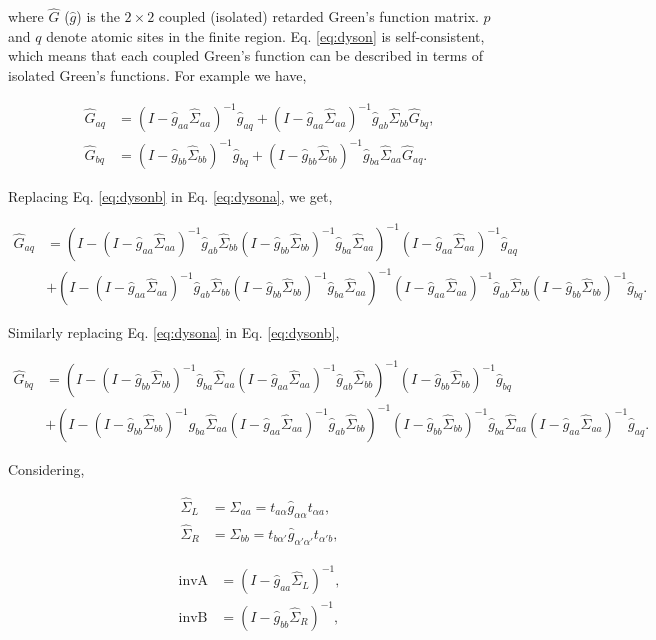 \documentclass[10pt,prb,showpacs,amssymb,floatfix]{revtex4-1}
\newcommand{\tx}{\text}
\newcommand{\nn}{\nonumber}
\newcommand{\alp}{\alpha}
\newcommand{\Sg}{\Sigma}
\newcommand{\h}{\hat}
\begin{document}
where $\h G$ ($\h g$) is the $2\times2$ coupled (isolated) retarded Green's function matrix. $p$ and $q$ denote  atomic sites in the finite region.  Eq. \eqref{eq:dyson} is self-consistent, which means that each coupled Green's function can be described in terms of isolated Green's functions. For example we have,

\begin{align}
\label{eq:dysona}
{\hat G}_{aq}&= (I-\h g_{aa}\h \Sg_{aa})^{-1}\h g_{aq} + (I-\h g_{aa}\h \Sg_{aa})^{-1}\h g_{ab}\h \Sg_{bb}\h G_{bq}, \\
{\hat G}_{bq}&= (I-\h g_{bb}\h \Sg_{bb})^{-1}\h g_{bq} + (I-\h g_{bb}\h \Sg_{bb})^{-1}\h g_{ba}\h \Sg_{aa}\h G_{aq}.
\label{eq:dysonb}
\end{align}

Replacing Eq. \eqref{eq:dysonb} in Eq. \eqref{eq:dysona}, we get,

 \begin{align}
\label{eq:dysonab}
{\hat G}_{aq}&= (I-(I-\h g_{aa}\h \Sg_{aa})^{-1}\h g_{ab}\h \Sg_{bb}(I-\h g_{bb}\h \Sg_{bb})^{-1}\h g_{ba}\h \Sg_{aa})^{-1}(I-\h g_{aa}\h \Sg_{aa})^{-1}\h g_{aq} \nn\\
&+ (I-(I-\h g_{aa}\h \Sg_{aa})^{-1}\h g_{ab}\h \Sg_{bb}(I-\h g_{bb}\h \Sg_{bb})^{-1}\h g_{ba}\h \Sg_{aa})^{-1}(I-\h g_{aa}\h \Sg_{aa})^{-1} \h g_{ab}\h \Sg_{bb}(I-\h g_{bb}\h \Sg_{bb})^{-1}\h g_{bq}.
\end{align}

Similarly replacing Eq. \eqref{eq:dysona} in Eq. \eqref{eq:dysonb},

 \begin{align}
\label{eq:dysonab}
{\hat G}_{bq}&= (I-(I-\h g_{bb}\h \Sg_{bb})^{-1}\h g_{ba}\h \Sg_{aa}(I-\h g_{aa}\h \Sg_{aa})^{-1}\h g_{ab}\h \Sg_{bb})^{-1}(I-\h g_{bb}\h \Sg_{bb})^{-1}\h g_{bq} \nn\\
&+ (I-(I-\h g_{bb}\h \Sg_{bb})^{-1}\h g_{ba}\h \Sg_{aa}(I-\h g_{aa}\h \Sg_{aa})^{-1}\h g_{ab}\h \Sg_{bb})^{-1}(I-\h g_{bb}\h \Sg_{bb})^{-1} \h g_{ba}\h \Sg_{aa}(I-\h g_{aa}\h \Sg_{aa})^{-1}\h g_{aq}.
\end{align}

Considering,

\begin{align}
\h \Sg_L &= \h \Sg_{aa}= t_{a\alp}\h g_{\alp\alp}t_{\alp a}, \\
\h \Sg_R &= \h \Sg_{bb}= t_{b\alp'}\h g_{\alp' \alp'} t_{\alp' b},
\end{align}

 \begin{align}
 \tx{invA} &= (I - \h g_{aa}\h \Sg_L)^{-1}, \\
 \tx{invB} &= (I - \h g_{bb}\h \Sg_R)^{-1},
 \end{align}
 
\end{document}
